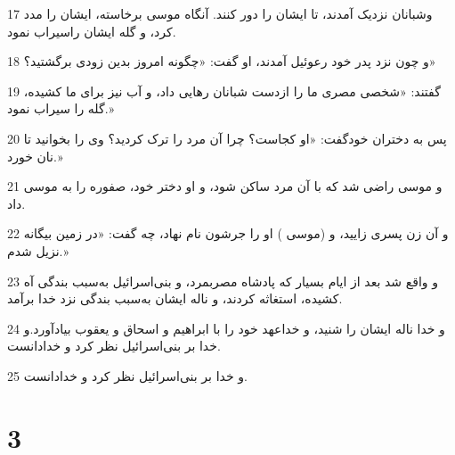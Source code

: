 \par 17 وشبانان نزدیک آمدند، تا ایشان را دور کنند. آنگاه موسی برخاسته، ایشان را مدد کرد، و گله ایشان راسیراب نمود.
\par 18 و چون نزد پدر خود رعوئیل آمدند، او گفت: «چگونه امروز بدین زودی برگشتید؟»
\par 19 گفتند: «شخصی مصری ما را ازدست شبانان رهایی داد، و آب نیز برای ما کشیده، گله را سیراب نمود.»
\par 20 پس به دختران خودگفت: «او کجاست؟ چرا آن مرد را ترک کردید؟ وی را بخوانید تا نان خورد.»
\par 21 و موسی راضی شد که با آن مرد ساکن شود، و او دختر خود، صفوره را به موسی داد.
\par 22 و آن زن پسری زایید، و (موسی ) او را جرشون نام نهاد، چه گفت: «در زمین بیگانه نزیل شدم.»
\par 23 و واقع شد بعد از ایام بسیار که پادشاه مصربمرد، و بنی‌اسرائیل به‌سبب بندگی آه کشیده، استغاثه کردند، و ناله ایشان به‌سبب بندگی نزد خدا برآمد.
\par 24 و خدا ناله ایشان را شنید، و خداعهد خود را با ابراهیم و اسحاق و یعقوب بیادآورد.و خدا بر بنی‌اسرائیل نظر کرد و خدادانست.
\par 25 و خدا بر بنی‌اسرائیل نظر کرد و خدادانست.
 
\chapter{3}

